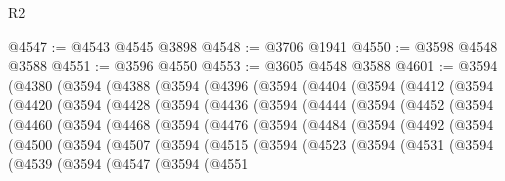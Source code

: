 \begin{lexlean}{R2}
\begin{coremodule}
@4547 := @4543 @4545 @3898
@4548 := @3706 @1941
@4550 := @3598 @4548 @3588
@4551 := @3596 @4550
@4553 := @3605 @4548 @3588
@4601 := @3594
    (@4380
      (@3594
        (@4388
          (@3594
            (@4396
              (@3594
                (@4404
                  (@3594
                    (@4412
                      (@3594
                        (@4420
                          (@3594
                            (@4428
                              (@3594
                                (@4436
                                  (@3594
                                    (@4444
                                      (@3594
                                        (@4452
                                          (@3594
                                            (@4460
                                              (@3594
                                                (@4468
                                                  (@3594
                                                    (@4476
                                                      (@3594
                                                        (@4484
                                                          (@3594
                                                            (@4492
                                                              (@3594
                                                                (@4500
                                                                  (@3594
                                                                    (@4507
                                                                      (@3594
                                                                        (@4515
                                                                          (@3594
                                                                            (@4523
                                                                              (@3594
                                                                                (@4531
                                                                                  (@3594
                                                                                    (@4539
                                                                                      (@3594
                                                                                        (@4547
                                                                                          (@3594
                                                                                            (@4551

\end{coremodule}
\end{lexlean}
